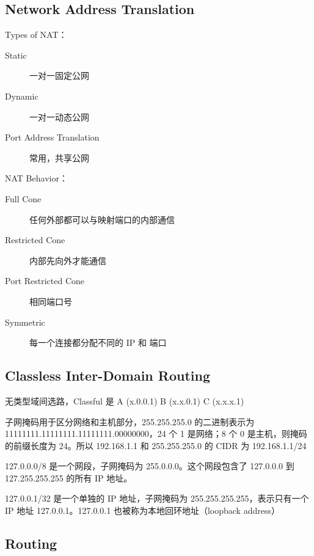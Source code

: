 \documentclass[11pt,journal,compsoc]{IEEEtran}
\begin{document}
\subsection{Network Address Translation}

Types of NAT：

\begin{description}
    \item[Static] 一对一固定公网

    \item[Dynamic] 一对一动态公网

    \item[Port Address Translation] 常用，共享公网
\end{description}

NAT Behavior：

\begin{description}
    \item[Full Cone] 任何外部都可以与映射端口的内部通信

    \item[Restricted Cone] 内部先向外才能通信

    \item[Port Restricted Cone] 相同端口号

    \item[Symmetric] 每一个连接都分配不同的 IP 和 端口
\end{description}


\subsection{Classless Inter-Domain Routing}

无类型域间选路，Classful 是 A (x.0.0.1) B (x.x.0.1) C (x.x.x.1)

子网掩码用于区分网络和主机部分，255.255.255.0 的二进制表示为 11111111.11111111.11111111.00000000，24 个 1 是网络；8 个 0 是主机，则掩码的前缀长度为 24。所以 192.168.1.1 和 255.255.255.0 的 CIDR 为 192.168.1.1/24

127.0.0.0/8 是一个网段，子网掩码为 255.0.0.0。这个网段包含了 127.0.0.0 到 127.255.255.255 的所有 IP 地址。

127.0.0.1/32 是一个单独的 IP 地址，子网掩码为 255.255.255.255，表示只有一个 IP 地址 127.0.0.1。127.0.0.1 也被称为本地回环地址（loopback address）


\subsection{Routing}
\end{document}

